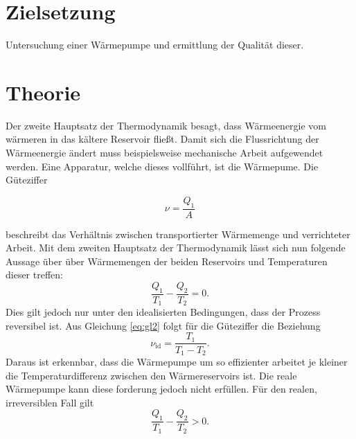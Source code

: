 \section{Zielsetzung}
Untersuchung einer Wärmepumpe und ermittlung der Qualität dieser.
\section{Theorie}
\label{sec:Theorie}

Der zweite Hauptsatz der Thermodynamik besagt, dass Wärmeenergie vom wärmeren in das kältere Reservoir fließt.
Damit sich die Flussrichtung der Wärmeenergie ändert muss beispielsweise mechanische Arbeit aufgewendet werden.
Eine Apparatur, welche dieses vollführt, ist die Wärmepume.
Die Güteziffer

\begin{equation}
	\label{eq:gl1}
	\nu=\frac{Q_1}{A}
\end{equation}

beschreibt das Verhältnis zwischen transportierter Wärmemenge und verrichteter Arbeit.
Mit dem zweiten Hauptsatz der Thermodynamik lässt sich nun folgende Aussage über über Wärmemengen der beiden Reservoirs und Temperaturen dieser treffen:
\begin{equation}
		\label{eq:gl2}
	\frac{Q_1}{T_1}-\frac{Q_2}{T_2}=0.
\end{equation}
Dies gilt jedoch nur unter den idealisierten Bedingungen, dass der Prozess reversibel ist.
Aus Gleichung \eqref{eq:gl2} folgt für die Güteziffer die Beziehung
\begin{equation}
	\nu_{\text{id}}=\frac{T_1}{T_1-T_2}.
	\label{eq:guetezifferideal}
\end{equation}
Daraus ist erkennbar, dass die Wärmepumpe um so effizienter arbeitet je kleiner die Temperaturdifferenz zwischen den Wärmereservoirs ist.
Die reale Wärmepumpe kann diese forderung jedoch nicht erfüllen.
Für den realen, irreversiblen Fall gilt
\begin{equation}
		\label{eq:gl3}
	\frac{Q_1}{T_1}-\frac{Q_2}{T_2}>0 .
\end{equation}
